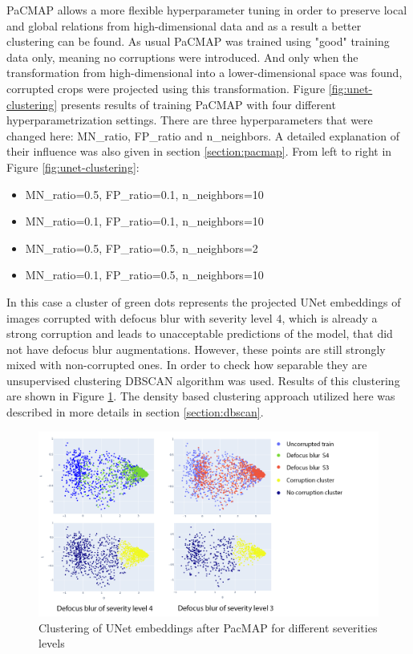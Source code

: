 PaCMAP allows a more flexible hyperparameter tuning in order to preserve local and global relations from high-dimensional data and as a result a better clustering can be found. As usual PaCMAP was trained using "good" training data only, meaning no corruptions were introduced. And only when the transformation from high-dimensional into a lower-dimensional space was found, corrupted crops were projected using this transformation. Figure \ref{fig:unet-clustering} presents results of training PaCMAP with four different hyperparametrization settings. There are three hyperparameters that were changed here: MN\_ratio, FP\_ratio and n\_neighbors. A detailed explanation of their influence was also given in section \ref{section:pacmap}. From left to right in Figure \ref{fig:unet-clustering}:

\begin{itemize}
	\item MN\_ratio=0.5, FP\_ratio=0.1, n\_neighbors=10
	\item MN\_ratio=0.1, FP\_ratio=0.1, n\_neighbors=10
	\item MN\_ratio=0.5, FP\_ratio=0.5, n\_neighbors=2
	\item MN\_ratio=0.1, FP\_ratio=0.5, n\_neighbors=10
\end{itemize}

In this case a cluster of green dots represents the projected UNet embeddings of images corrupted with defocus blur with severity level $4$, which is already a strong corruption and leads to unacceptable predictions of the model, that did not have defocus blur augmentations. However, these points are still strongly mixed with non-corrupted ones. In order to check how separable they are unsupervised clustering DBSCAN algorithm was used. Results of this clustering are shown in Figure \ref{fig:unet-clustering-sev-levels}. The density based clustering approach utilized here was described in more details in section \ref{section:dbscan}. 

\begin{figure}[htb]
	\begin{center}
		\includegraphics[width=0.6\linewidth]{bilder/unet-embeddings/db-levels.png}
		\caption{Clustering of UNet embeddings after PacMAP for different severities levels}
		\label{fig:unet-clustering-sev-levels}
	\end{center}
\end{figure}

